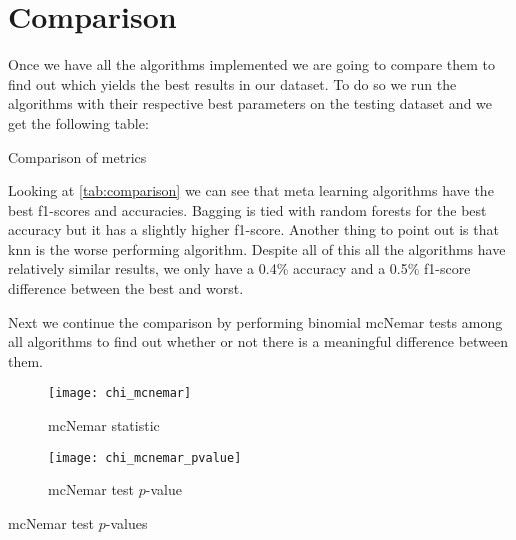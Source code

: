
\section{Comparison}%
\label{sec:comparison}


Once we have all the algorithms implemented we are going to compare them to find out which yields the best results in our dataset. To do so we run the algorithms with their respective best parameters on the testing dataset and we get the following table:

\begin{table}[H]
\centering
\caption{Comparison of metrics}%
\label{tab:comparison}

\end{table}

Looking at \cref{tab:comparison} we can see that meta learning algorithms have the best f1-scores and accuracies. Bagging is tied with random forests for the best accuracy but it has a slightly higher f1-score. Another thing to point out is that knn is the worse performing algorithm. Despite all of this all the algorithms have relatively similar results, we only have a 0.4\% accuracy and a 0.5\% f1-score difference between the best and worst. 

Next we continue the comparison by performing binomial mcNemar tests among all algorithms to find out whether or not there is a meaningful difference between them.

\begin{figure}[H]
\centering
\texttt{[image: chi\_mcnemar]}
\caption{mcNemar statistic}
\end{figure}

\begin{figure}[H]
\centering
\texttt{[image: chi\_mcnemar\_pvalue]}
\caption{mcNemar test $p$-value}
\end{figure}

\begin{table}[H]
\centering
\caption{mcNemar test $p$-values}
    
\end{table}